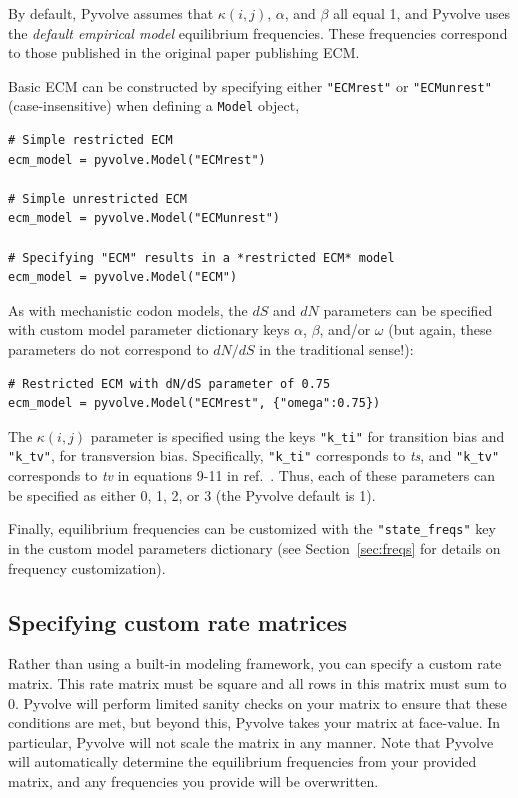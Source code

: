 \documentclass{article}
\newcommand{\code}[1]{\texttt{\small{#1}}}
\begin{document}
By default, Pyvolve assumes that $\kappa(i,j)$, $\alpha$, and $\beta$ all equal 1, and Pyvolve uses the \emph{default empirical model} equilibrium frequencies. These frequencies correspond to those published in the original paper publishing ECM.

Basic ECM can be constructed by specifying either \code{"ECMrest"} or \code{"ECMunrest"} (case-insensitive) when defining a \code{Model} object,
\begin{lstlisting}
# Simple restricted ECM
ecm_model = pyvolve.Model("ECMrest")

# Simple unrestricted ECM
ecm_model = pyvolve.Model("ECMunrest")

# Specifying "ECM" results in a *restricted ECM* model
ecm_model = pyvolve.Model("ECM")
\end{lstlisting}

As with mechanistic codon models, the $dS$ and $dN$ parameters can be specified with custom model parameter dictionary keys $\alpha$, $\beta$, and/or $\omega$ (but again, these parameters do not correspond to $dN/dS$ in the traditional sense!):
\begin{lstlisting}
# Restricted ECM with dN/dS parameter of 0.75
ecm_model = pyvolve.Model("ECMrest", {"omega":0.75})
\end{lstlisting}

The $\kappa(i,j)$ parameter is specified using the keys \code{"k\_ti"} for transition bias and \code{"k\_tv"}, for transversion bias. Specifically, \code{"k\_ti"} corresponds to \emph{ts}, and \code{"k\_tv"} corresponds to \emph{tv} in equations 9-11 in ref.\ \citep{ECM}. Thus, each of these parameters can be specified as either 0, 1, 2, or 3 (the Pyvolve default is 1).


Finally, equilibrium frequencies can be customized with the \code{"state\_freqs"} key in the custom model parameters dictionary (see Section~\ref{sec:freqs} for details on frequency customization). 



\subsection{Specifying custom rate matrices}\label{sec:custom}

Rather than using a built-in modeling framework, you can specify a custom rate matrix. This rate matrix must be square and all rows in this matrix must sum to 0. Pyvolve will perform limited sanity checks on your matrix to ensure that these conditions are met, but beyond this, Pyvolve takes your matrix at face-value. In particular, Pyvolve will not scale the matrix in any manner. Note that Pyvolve will automatically determine the equilibrium frequencies from your provided matrix, and any frequencies you provide will be overwritten. 
\end{document}
